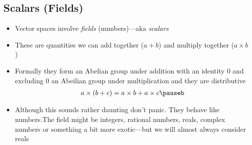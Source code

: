 \begin{slide}
\section[-2]{Scalars (Fields)}

\begin{PauseHighLight}
  \begin{itemize}
  \item Vector spaces involve \emph{fields} (numbers)\pause---aka \emph{scalars}\pauseb
  \item These are quantities we can add together ($a+b$) and
    multiply together ($a\times b$)\pause
  \item Formally they form an Abelian group under addition with an identity $0$\pauseb{}
    and excluding $0$ an Abeilian group under multiplication\pauseb{} and they are distributive
    \begin{align*}
      a\times (b + c) = a\times b + a\times c\pauseb
    \end{align*}
  \item Although this sounds rather daunting don't panic\pauseb.  They behave
    like numbers.\pauseb  The field might be integers, rational numbers,
    reals, complex numbers or something a bit more exotic\pauseb---but
    we will almost always consider reals\pauseb
  \end{itemize}
\end{PauseHighLight}
  

\end{slide}



